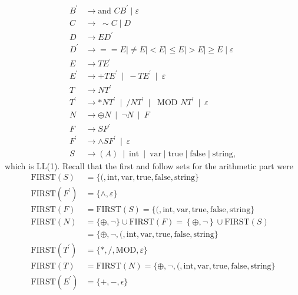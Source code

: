 \documentclass{report}
\begin{document}
\begin{itemize}
\begin{align*}
            B^{\prime} &\to \text{and }CB^{\prime} \mid \varepsilon \\
            C &\to\; \sim C \mid D\\
            D &\to ED^{\prime} \\
            D^{\prime} &\to ==E \mid \ne E \mid <E \mid \leq E \mid > E \mid \geq E \mid \varepsilon\\
            E &\to TE^{\prime} \\
            E^{\prime} &\to +TE^{\prime} \ \mid \ -TE^{\prime} \ \mid \ \varepsilon \\
            T &\to NT^{\prime} \\
            T^{\prime} &\to *NT^{\prime} \ \mid \ /NT^{\prime} \ \mid \ \text{ MOD } NT^{\prime} \ \mid \ \varepsilon \\
            N &\to \oplus N \ \mid \ \neg N \ \mid \ F \\
            F &\to SF^{\prime} \\
            F^{\prime} &\to \land SF^{\prime} \ \mid \ \varepsilon\\
            S &\to (A) \ \mid \ \text{int} \ \mid \ \text{var} \mid \text{true} \mid \text{false} \mid \text{string}
        ,\end{align*}
        which is LL(1). Recall that the first and follow sets for the arithmetic part were
         \begin{align*}
                \text{FIRST}(S) &= \{(,\text{int}, \text{var}, \text{true}, \text{false}, \text{string}\} \\
                \text{FIRST}(F^{\prime}) &= \{\land, \varepsilon\} \\
                \text{FIRST}(F) &=  \text{FIRST}(S) = \{(, \text{int}, \text{var}, \text{true}, \text{false}, \text{string}\} \\
                \text{FIRST}(N) &= \{\oplus,\neg\} \cup \text{FIRST}(F) = \left\{\oplus, \neg\right\} \cup \text{FIRST}(S) \\
                                &= \{\oplus,\neg,(,\text{int}, \text{var}, \text{true}, \text{false}, \text{string}\} \\
                \text{FIRST}(T^{\prime}) &= \{*, /, \text{MOD}, \varepsilon\} \\
                \text{FIRST}(T) &= \text{FIRST}(N) = \{\oplus,\neg,(,\text{int}, \text{var}, \text{true}, \text{false}, \text{string}\} \\
                \text{FIRST}(E^{\prime}) &= \{+,-,\epsilon\} \\

\end{align*}
\end{itemize}
\end{document}
